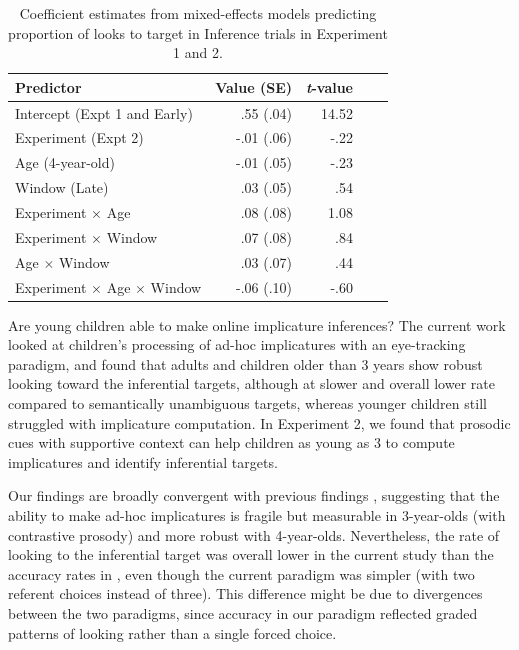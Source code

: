 \documentclass[10pt,letterpaper]{article}
\begin{document}
\begin{table}[b!]
\caption{\label{tab:lmer4}  Coefficient estimates from mixed-effects models predicting proportion of looks to target in Inference trials in Experiment 1 and 2.} 
\begin{center} 
\begin{tabular}{l r r r l} 
\hline
Predictor  &  Value (SE) & \emph{t}-value\\
\hline
Intercept (Expt 1 and Early)  & .55 (.04) & 14.52 \\
Experiment (Expt 2)  & -.01 (.06) &  -.22 \\
Age (4-year-old) & -.01 (.05) &  -.23 \\
Window (Late) & .03 (.05) & .54 \\
Experiment $\times$  Age & .08 (.08) & 1.08 \\
Experiment $\times$  Window & .07 (.08) & .84 \\
Age $\times$  Window & .03 (.07) & .44 \\
Experiment $\times$ Age $\times$ Window & -.06 (.10) & -.60 \\
\hline
\end{tabular} 
\end{center} 
\end{table}

Are young children able to make online implicature inferences? The current work looked at children's processing of ad-hoc implicatures with an eye-tracking paradigm, and found that adults and children older than 3 years show robust looking toward the inferential targets, although at slower and overall lower rate compared to semantically unambiguous targets, whereas younger children still struggled with implicature computation. In Experiment 2, we found that prosodic cues with supportive context can help children as young as 3 to compute implicatures and identify inferential targets.

Our findings are broadly convergent with previous findings \cite{stillerLLD}, suggesting that the ability to make ad-hoc implicatures is fragile but measurable in 3-year-olds (with contrastive prosody) and more robust with 4-year-olds. Nevertheless, the rate of looking to the inferential target was overall lower in the current study than the accuracy rates in , even though the current paradigm was simpler (with two referent choices instead of three). This difference might be due to divergences between the two paradigms, since accuracy in our paradigm reflected graded patterns of looking rather than a single forced choice. 
\end{document}
